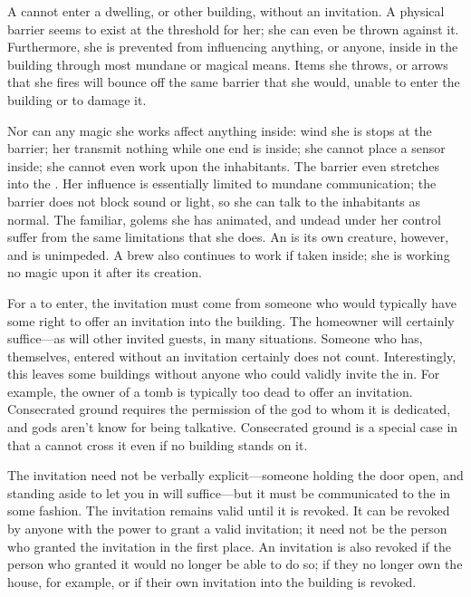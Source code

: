 A {\vampire} cannot enter a dwelling, or other building, without an invitation.
A physical barrier seems to exist at the threshold for her; she can even be thrown against it.
Furthermore, she is prevented from influencing anything, or anyone, inside in the building through most mundane or magical means.
Items she throws, or arrows that she fires will bounce off the same barrier that she would, unable to enter the building or to damage it.

Nor can any magic she works affect anything inside: wind she is  stops at the barrier; her {\symlinks} transmit nothing while one end is inside; she cannot place a  sensor inside; she cannot even work  upon the inhabitants.
The barrier even stretches into the {\mentalrealm}.
Her influence is essentially limited to mundane communication; the barrier does not block sound or light, so she can talk to the inhabitants as normal.
The {\vampirepossessive} familiar, golems she has animated, and undead under her control suffer from the same limitations that she does.
An  is its own creature, however, and is unimpeded.
A {\vampirepossessive} brew also continues to work if taken inside; she is working no magic upon it after its creation.

For a {\vampire} to enter, the invitation must come from someone who would typically have some right to offer an invitation into the building.
The homeowner will certainly suffice---as will other invited guests, in many situations.
Someone who has, themselves, entered without an invitation certainly does not count.
Interestingly, this leaves some buildings without anyone who could validly invite the {\vampire} in.
For example, the owner of a tomb is typically too dead to offer an invitation.
Consecrated ground requires the permission of the god to whom it is dedicated, and gods aren't know for being talkative.
Consecrated ground is a special case in that a {\vampire} cannot cross it even if no building stands on it.

The invitation need not be verbally explicit---someone holding the door open, and standing aside to let you in will suffice---but it must be communicated to the {\vampire} in some fashion.
The invitation remains valid until it is revoked.
It can be revoked by anyone with the power to grant a valid invitation; it need not be the person who granted the invitation in the first place.
An invitation is also revoked if the person who granted it would no longer be able to do so; if they no longer own the house, for example, or if their own invitation into the building is revoked.

